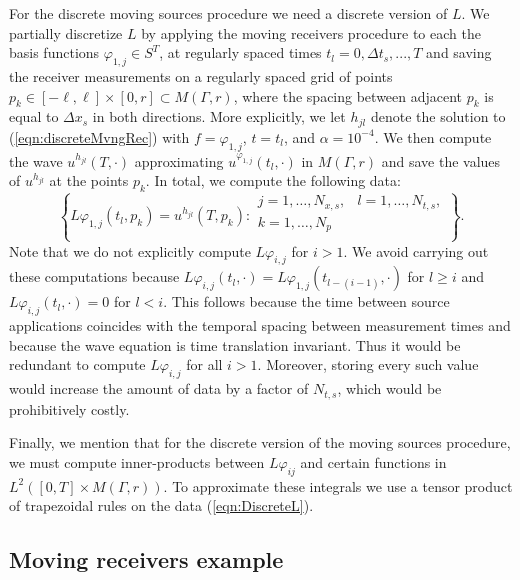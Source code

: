 \documentclass[final,leqno]{siamart1116}
\begin{document}
For the discrete moving sources procedure we need a discrete version
of $L$. We partially discretize $L$ by applying the moving receivers
procedure to each the basis functions $\varphi_{1,j} \in S^T$, at
regularly spaced times $t_l = 0, \Delta t_s, ..., T$ and saving the
receiver measurements on a regularly spaced grid of points $p_k \in
[-\ell,\ell] \times [0, r] \subset M(\Gamma,r)$, where the spacing
between adjacent $p_k$ is equal to $\Delta x_s$ in both
directions. More explicitly, we let $h_{jl}$ denote the solution to
(\ref{eqn:discreteMvngRec}) with $f = \varphi_{1,j}$, $t = t_l$, and
$\alpha = 10^{-4}$. We then compute the wave $u^{h_{jl}}(T,\cdot)$
approximating $u^{\varphi_{1,j}}(t_l,\cdot)$ in $M(\Gamma,r)$ and save
the values of $u^{h_{jl}}$ at the points $p_k$. In total, we compute
the following data:
\begin{equation}
  \label{eqn:DiscreteL}
  \left\{ L \varphi_{1,j}(t_{l},p_{k}) = u^{h_{jl}}(T,p_k) : 
  \begin{array}{ll}
    j = 1,\ldots,N_{x,s}, &l=1,\ldots,N_{t,s}, \\
    k = 1,\ldots,N_{p} & \\
  \end{array}
  \right\}.
\end{equation}
Note that we do not explicitly compute $L\varphi_{i,j}$ for $i >
1$. We avoid carrying out these computations because
$L\varphi_{i,j}(t_l,\cdot) = L\varphi_{1,j}(t_{l-(i-1)},\cdot)$ for $l
\geq i$ and $L\varphi_{i,j}(t_l,\cdot) = 0$ for $l < i$. This follows
because the time between source applications coincides with the
temporal spacing between measurement times and because the wave
equation is time translation invariant.  Thus it would be redundant to
compute $L\varphi_{i,j}$ for all $i > 1$. Moreover, storing every such
value would increase the amount of data by a factor of $N_{t,s}$,
which would be prohibitively costly. 

Finally, we mention that for the discrete version of the moving
sources procedure, we must compute inner-products between
$L\varphi_{ij}$ and certain functions in $L^2([0,T] \times
M(\Gamma,r))$. To approximate these integrals we use a tensor product
of trapezoidal rules on the data (\ref{eqn:DiscreteL}).

\subsection{Moving receivers example}
\end{document}
